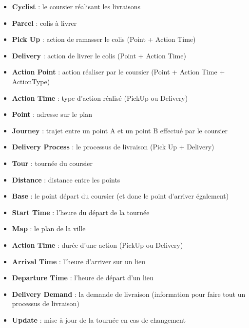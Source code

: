 \documentclass{scrartcl}
\begin{document}
\begin{itemize}
\item \textbf{Cyclist} : le coursier réalisant les livraisons
\item \textbf{Parcel} : colis à livrer
\item \textbf{Pick Up }: action de ramasser le colis (Point + Action Time)
\item \textbf{Delivery} : action de livrer le colis (Point + Action Time)
\item \textbf{Action Point} : action réaliser par le coursier (Point + Action Time + ActionType)
\item \textbf{Action Time} : type d'action réalisé (PickUp ou Delivery)
\item \textbf{Point} : adresse sur le plan
\item \textbf{Journey} : trajet entre un point A et un point B effectué par le coursier
\item \textbf{Delivery Process }: le processus de livraison (Pick Up + Delivery)
\item \textbf{Tour} : tournée du coursier
\item \textbf{Distance} : distance entre les points
\item \textbf{Base} : le point départ du coursier (et donc le point d'arriver également)
\item \textbf{Start Time} : l'heure du départ de la tournée
\item \textbf{Map} : le plan de la ville
\item \textbf{Action Time }: durée d'une action (PickUp ou Delivery)
\item \textbf{Arrival Time }: l'heure d'arriver sur un lieu
\item \textbf{Departure Time} : l'heure de départ d'un lieu
\item \textbf{Delivery Demand} : la demande de livraison (information pour faire tout un processus de livraison)
\item \textbf{Update }: mise à jour de la tournée en cas de changement

\end{itemize}
\end{document}
